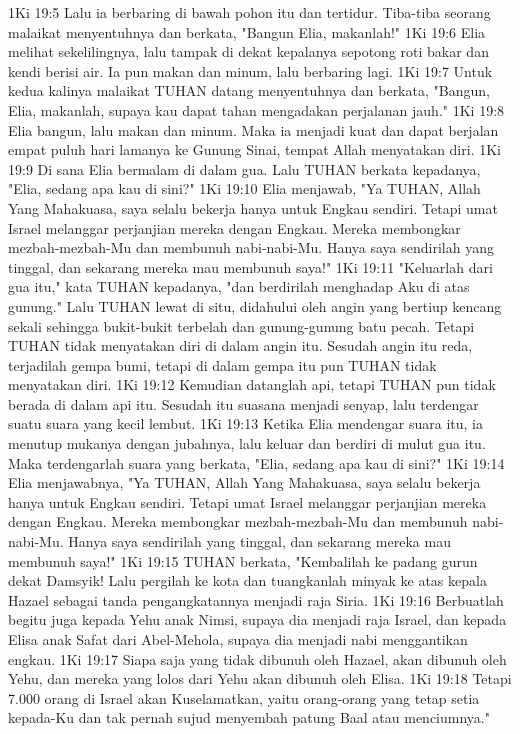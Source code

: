 1Ki 19:5  Lalu ia berbaring di bawah pohon itu dan tertidur. Tiba-tiba seorang malaikat menyentuhnya dan berkata, "Bangun Elia, makanlah!"
1Ki 19:6  Elia melihat sekelilingnya, lalu tampak di dekat kepalanya sepotong roti bakar dan kendi berisi air. Ia pun makan dan minum, lalu berbaring lagi.
1Ki 19:7  Untuk kedua kalinya malaikat TUHAN datang menyentuhnya dan berkata, "Bangun, Elia, makanlah, supaya kau dapat tahan mengadakan perjalanan jauh."
1Ki 19:8  Elia bangun, lalu makan dan minum. Maka ia menjadi kuat dan dapat berjalan empat puluh hari lamanya ke Gunung Sinai, tempat Allah menyatakan diri.
1Ki 19:9  Di sana Elia bermalam di dalam gua. Lalu TUHAN berkata kepadanya, "Elia, sedang apa kau di sini?"
1Ki 19:10  Elia menjawab, "Ya TUHAN, Allah Yang Mahakuasa, saya selalu bekerja hanya untuk Engkau sendiri. Tetapi umat Israel melanggar perjanjian mereka dengan Engkau. Mereka membongkar mezbah-mezbah-Mu dan membunuh nabi-nabi-Mu. Hanya saya sendirilah yang tinggal, dan sekarang mereka mau membunuh saya!"
1Ki 19:11  "Keluarlah dari gua itu," kata TUHAN kepadanya, "dan berdirilah menghadap Aku di atas gunung." Lalu TUHAN lewat di situ, didahului oleh angin yang bertiup kencang sekali sehingga bukit-bukit terbelah dan gunung-gunung batu pecah. Tetapi TUHAN tidak menyatakan diri di dalam angin itu. Sesudah angin itu reda, terjadilah gempa bumi, tetapi di dalam gempa itu pun TUHAN tidak menyatakan diri.
1Ki 19:12  Kemudian datanglah api, tetapi TUHAN pun tidak berada di dalam api itu. Sesudah itu suasana menjadi senyap, lalu terdengar suatu suara yang kecil lembut.
1Ki 19:13  Ketika Elia mendengar suara itu, ia menutup mukanya dengan jubahnya, lalu keluar dan berdiri di mulut gua itu. Maka terdengarlah suara yang berkata, "Elia, sedang apa kau di sini?"
1Ki 19:14  Elia menjawabnya, "Ya TUHAN, Allah Yang Mahakuasa, saya selalu bekerja hanya untuk Engkau sendiri. Tetapi umat Israel melanggar perjanjian mereka dengan Engkau. Mereka membongkar mezbah-mezbah-Mu dan membunuh nabi-nabi-Mu. Hanya saya sendirilah yang tinggal, dan sekarang mereka mau membunuh saya!"
1Ki 19:15  TUHAN berkata, "Kembalilah ke padang gurun dekat Damsyik! Lalu pergilah ke kota dan tuangkanlah minyak ke atas kepala Hazael sebagai tanda pengangkatannya menjadi raja Siria.
1Ki 19:16  Berbuatlah begitu juga kepada Yehu anak Nimsi, supaya dia menjadi raja Israel, dan kepada Elisa anak Safat dari Abel-Mehola, supaya dia menjadi nabi menggantikan engkau.
1Ki 19:17  Siapa saja yang tidak dibunuh oleh Hazael, akan dibunuh oleh Yehu, dan mereka yang lolos dari Yehu akan dibunuh oleh Elisa.
1Ki 19:18  Tetapi 7.000 orang di Israel akan Kuselamatkan, yaitu orang-orang yang tetap setia kepada-Ku dan tak pernah sujud menyembah patung Baal atau menciumnya."
